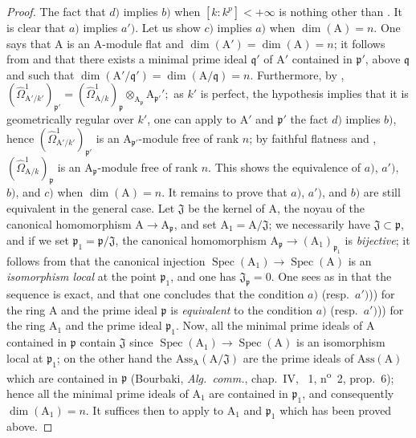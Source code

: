 \begin{proof}
The fact that $d)$ implies $b)$ when $[k:k^p]<+\infty$ is nothing other than .
It is clear that $a)$ implies $a')$.
Let us show $c)$ implies $a)$ when $\dim(\mathrm{A})=n$.
One says that $\mathrm{A}$ is an $\mathrm{A}$-module flat  and $\dim(\mathrm{A}')=\dim(\mathrm{A})=n$; it follows from  and  that there exists a minimal prime ideal $\mathfrak{q}'$ of $\mathrm{A}'$ contained in $\mathfrak{p}'$, above $\mathfrak{q}$ and such that $\dim(\mathrm{A}'/\mathfrak{q}')=\dim(\mathrm{A}/\mathfrak{q})=n$.
Furthermore, by , $(\hat{\Omega}^1_{\mathrm{A}'/k'})_{\mathfrak{p}'}=(\hat{\Omega}^1_{\mathrm{A}/k})_\mathfrak{p}\otimes_{\mathrm{A}_\mathfrak{p}}\mathrm{A}_{\mathfrak{p}'}'; $ as $k'$ is perfect, the hypothesis implies that it is geometrically regular over $k'$, one can apply to $\mathrm{A}'$ and $\mathfrak{p}'$ the fact $d)$ implies $b)$, hence $(\hat{\Omega}^1_{\mathrm{A}'/k'})_{\mathfrak{p}'}$ is an $\mathrm{A}_{\mathfrak{p}'}$-module free of rank $n$; by faithful flatness  and , $(\hat{\Omega}^1_{\mathrm{A}/k})_\mathfrak{p}$ is an $\mathrm{A}_\mathfrak{p}$-module free of rank $n$.
This shows the equivalence of $a)$, $a')$, $b)$, and $c)$ when $\dim(\mathrm{A})=n$.
It remains to prove that $a)$, $a')$, and $b)$ are still equivalent in the general case.
Let $\mathfrak{J}$ be the kernel of $\mathrm{A}$, the noyau of the canonical homomorphism $\mathrm{A}\to\mathrm{A}_\mathfrak{p}$, and set $\mathrm{A}_1=\mathrm{A}/\mathfrak{J}$; we necessarily have $\mathfrak{J}\subset\mathfrak{p}$, and if we set $\mathfrak{p}_1=\mathfrak{p}/\mathfrak{J}$, the canonical homomorphism $\mathrm{A}_\mathfrak{p}\to(\mathrm{A}_1)_{\mathfrak{p}_1}$ is \emph{bijective}; it follows from  that the canonical injection $\operatorname{Spec}(\mathrm{A}_1)\to\operatorname{Spec}(\mathrm{A})$ is an \emph{isomorphism local} at the point $\mathfrak{p}_1$, and one has $\mathfrak{J}_\mathfrak{p}=0$.
One sees as in  that the sequence is exact, and that one concludes that the condition $a)$ (resp.\ $a')$)) for the ring $\mathrm{A}$ and the prime ideal $\mathfrak{p}$ is \emph{equivalent} to the condition $a)$ (resp.\ $a')$)) for the ring $\mathrm{A}_1$ and the prime ideal $\mathfrak{p}_1$.
Now, all the minimal prime ideals of $\mathrm{A}$ contained in $\mathfrak{p}$ contain $\mathfrak{J}$ since $\operatorname{Spec}(\mathrm{A}_1)\to\operatorname{Spec}(\mathrm{A})$ is an isomorphism local at $\mathfrak{p}_1$; on the other hand the $\mathrm{Ass}_\mathrm{A}(\mathrm{A}/\mathfrak{J})$ are the prime ideals of $\mathrm{Ass}(\mathrm{A})$ which are contained in $\mathfrak{p}$ (Bourbaki, \emph{Alg.\ comm.}, chap.~IV, \textsection~1, n\textsuperscript{o}~2, prop.~6); hence all the minimal prime ideals of $\mathrm{A}_1$ are contained in $\mathfrak{p}_1$, and consequently $\dim(\mathrm{A}_1)=n$.
It suffices then to apply to $\mathrm{A}_1$ and $\mathfrak{p}_1$ which has been proved above.
\end{proof}

